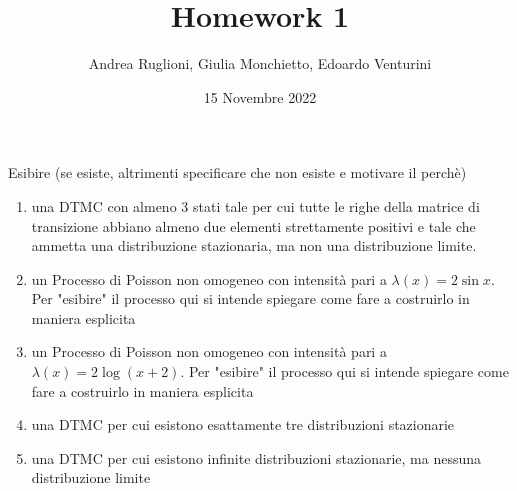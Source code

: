 \documentclass[
	12pt, %
]{fphw}
\title{Homework 1} %
\author{Andrea Ruglioni, Giulia Monchietto, Edoardo Venturini} %
\date{15 Novembre 2022} %
\institute{Politecnico di Torino} %
\begin{document}
\maketitle %

\begin{problem}
	\smallskip
	Esibire (se esiste, altrimenti specificare che non esiste e motivare il perchè)
	\begin{enumerate}
		\item una DTMC con almeno 3 stati tale per cui tutte le righe della
		matrice di transizione abbiano almeno due elementi strettamente positivi e tale che ammetta una distribuzione stazionaria,
		ma non una distribuzione limite.
		\item un Processo di Poisson non omogeneo con intensità pari a $\lambda(x) = 2\sin x$. Per "esibire" il processo qui si intende spiegare come fare
		a costruirlo in maniera esplicita
		\item un Processo di Poisson non omogeneo con intensità pari a $\lambda(x) = 2\log (x+2)$. Per "esibire" il processo qui si intende spiegare come fare
		a costruirlo in maniera esplicita
		\item una DTMC per cui esistono esattamente tre distribuzioni stazionarie
		\item una DTMC per cui esistono infinite distribuzioni stazionarie,
		ma nessuna distribuzione limite		
	\end{enumerate}
	\smallskip
\end{problem}
\end{document}
